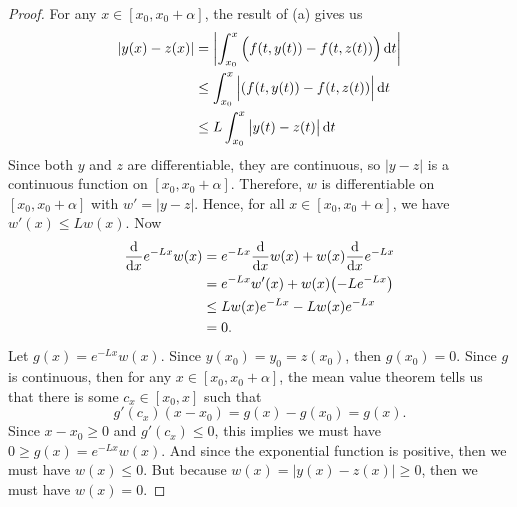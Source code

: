 \documentclass[12pt]{article}
\theoremstyle{definition}
\begin{document}
\begin{proof}
    For any $x \in [x_0, x_0 + \alpha]$, the result of (a) gives us
    \begin{align*}
        \abs{y(x) - z(x)}
            &= \abs{\int_{x_0}^{x} \qty\Big(f(t, y(t)) - f(t, z(t))) \dd{t}} \\
            &\leq \int_{x_0}^{x} \abs\Big{(f(t, y(t)) - f(t, z(t))} \dd{t} \\
            &\leq L\int_{x_0}^{x} \abs\big{y(t) - z(t)} \dd{t}
    \end{align*}
    Since both $y$ and $z$ are differentiable, they are continuous, so $|y - z|$ is a continuous function on $[x_0, x_0 + \alpha]$. Therefore, $w$ is differentiable on $[x_0, x_0 + \alpha]$ with $w' = |y - z|$. Hence, for all $x \in [x_0, x_0 + \alpha]$, we have $w'(x) \leq Lw(x)$. Now
    \begin{align*}
        \dv{x} e^{-Lx} w(x)
            &= e^{-Lx} \dv{x}w(x) + w(x) \dv{x} e^{-Lx} \\
            &= e^{-Lx} w'(x) + w(x)\qty(-Le^{-Lx}) \\
            &\leq Lw(x)e^{-Lx} - Lw(x)e^{-Lx} \\
            &= 0.
    \end{align*}
    Let $g(x) = e^{-Lx} w(x)$. Since $y(x_0) = y_0 = z(x_0)$, then $g(x_0) = 0$. Since $g$ is continuous, then for any $x \in [x_0, x_0 + \alpha]$, the mean value theorem tells us that there is some $c_x \in [x_0, x]$ such that
    \[
        g'(c_x)(x - x_0) = g(x) - g(x_0) = g(x).
    \]
    Since $x - x_0 \geq 0$ and $g'(c_x) \leq 0$, this implies we must have $0 \geq g(x) = e^{-Lx}w(x)$. And since the exponential function is positive, then we must have $w(x) \leq 0$. But because $w(x) = |y(x) - z(x)| \geq 0$, then we must have $w(x) = 0$.
    
\end{proof}
\end{document}
